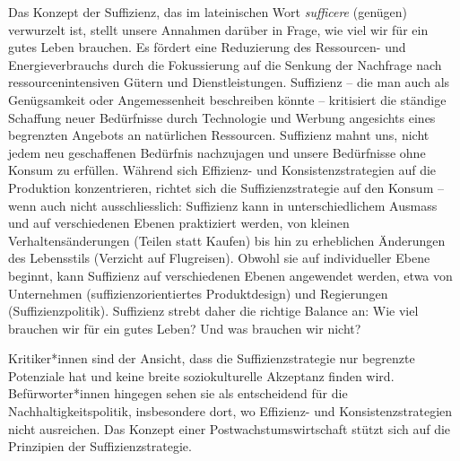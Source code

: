 \documentclass[
  nswissgerman,
  a4paper,
  DIV=11,
  numbers=noendperiod,
  oneside,
  openany]{scrreprt}
\begin{document}
Das Konzept der Suffizienz, das im lateinischen Wort \emph{sufficere}
(genügen) verwurzelt ist, stellt unsere Annahmen darüber in Frage, wie
viel wir für ein gutes Leben brauchen. Es fördert eine Reduzierung des
Ressourcen- und Energieverbrauchs durch die Fokussierung auf die Senkung
der Nachfrage nach ressourcenintensiven Gütern und Dienstleistungen.
Suffizienz -- die man auch als Genügsamkeit oder Angemessenheit
beschreiben könnte -- kritisiert die ständige Schaffung neuer
Bedürfnisse durch Technologie und Werbung angesichts eines begrenzten
Angebots an natürlichen Ressourcen. Suffizienz mahnt uns, nicht jedem
neu geschaffenen Bedürfnis nachzujagen und unsere Bedürfnisse ohne
Konsum zu erfüllen. Während sich Effizienz- und Konsistenzstrategien auf
die Produktion konzentrieren, richtet sich die Suffizienzstrategie auf
den Konsum -- wenn auch nicht ausschliesslich: Suffizienz kann in
unterschiedlichem Ausmass und auf verschiedenen Ebenen praktiziert
werden, von kleinen Verhaltensänderungen (Teilen statt Kaufen) bis hin
zu erheblichen Änderungen des Lebensstils (Verzicht auf Flugreisen).
Obwohl sie auf individueller Ebene beginnt, kann Suffizienz auf
verschiedenen Ebenen angewendet werden, etwa von Unternehmen
(suffizienzorientiertes Produktdesign) und Regierungen
(Suffizienzpolitik). Suffizienz strebt daher die richtige Balance an:
Wie viel brauchen wir für ein gutes Leben? Und was brauchen wir nicht?

Kritiker*innen sind der Ansicht, dass die Suffizienzstrategie nur
begrenzte Potenziale hat und keine breite soziokulturelle Akzeptanz
finden wird. Befürworter*innen hingegen sehen sie als entscheidend für
die Nachhaltigkeitspolitik, insbesondere dort, wo Effizienz- und
Konsistenzstrategien nicht ausreichen. Das Konzept einer
Postwachstumswirtschaft stützt sich auf die Prinzipien der
Suffizienzstrategie.
\end{document}
